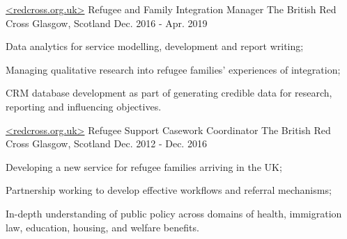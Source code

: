 \begin{cventries}
  \cventry
    {\href{https://www.redcross.org.uk/}{<redcross.org.uk>}\vspace{-5pt} \newline Refugee and Family Integration Manager } %
    {The British Red Cross\vspace{-9pt}} %
    {Glasgow, Scotland} %
    {Dec. 2016 - Apr. 2019} %
    {
      \begin{cvitems} %
        \item {Data analytics for service modelling, development and report writing;}
        \item {Managing qualitative research into refugee families’ experiences of integration;}
        \item {CRM database development as part of generating credible data for research, reporting and influencing objectives. }
      \end{cvitems}
    }

  \cventry
    {\href{https://www.redcross.org.uk/}{<redcross.org.uk>}\vspace{-5pt} \newline Refugee Support Casework Coordinator} %
    {The British Red Cross\vspace{-9pt}} %
    {Glasgow, Scotland} %
    {Dec. 2012 - Dec. 2016} %
    {
      \begin{cvitems} %
        \item {Developing a new service for refugee families arriving in the UK; }
        \item {Partnership working to develop effective workflows and referral mechanisms; }
        \item{In-depth understanding of public policy across domains of health, immigration law, education, housing, and welfare benefits.}
      \end{cvitems}
    }

\end{cventries}
